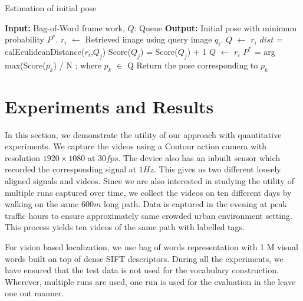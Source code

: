 \begin{algorithm}[h]
\caption{Estimation of initial pose}
\label{algo:estimation_init_prob}
\begin{algorithmic}[1]
\State \textbf{Input:} Bag-of-Word frame work, $Q$: Queue
\State \textbf{Output:} Initial pose with minimum probability $P^*$.
	\State $r_i$ $\leftarrow$ Retrieved image using query image $q_i$.
		\State $Q$ $\leftarrow$ $r_i$
	\Else
		 	\State $dist$ = calEculideanDistance($r_i$,$Q_j$)
 				\State Score($Q_j$) = Score($Q_j$) + 1
 			\Else
 				\State $Q$ $\leftarrow$ $r_i$
	 		\EndIf
		\EndFor
	\EndIf	
\EndFor
\State $P^*$ = arg max(Score($p_k$) / N ; where $p_k$ $\in$ Q
\State Return the pose corresponding to $p_k$
\end{algorithmic}
\end{algorithm}

\section{Experiments and Results}
\label{sec:experiments_results}

In this section, we demonstrate the utility of our approach with quantitative
experiments. 
We capture the videos using a Contour action camera \cite{contour_camera} with 
resolution $1920\times1080$ at $30fps$. The device also has an
inbuilt \gps sensor which recorded the corresponding \gps signal at $1Hz$.
This gives us two different loosely aligned signals \gps and videos. 
Since we are also interested in studying the utility of multiple runs
captured over time, we collect the videos on ten different days by walking on 
the same $600m$ long path. Data is captured in the evening at peak traffic hours to ensure 
approximately same crowded urban environment setting. This process yields ten videos
of the same path with labelled \gps tags.

For vision based localization, we use bag of words representation
with 1 M visual words built on top of dense SIFT descriptors. During all the experiments, we have ensured that
the test data is not used for the vocabulary construction. Wherever,
multiple runs are used, one run is used for the evaluation in the leave  one
out manner.

